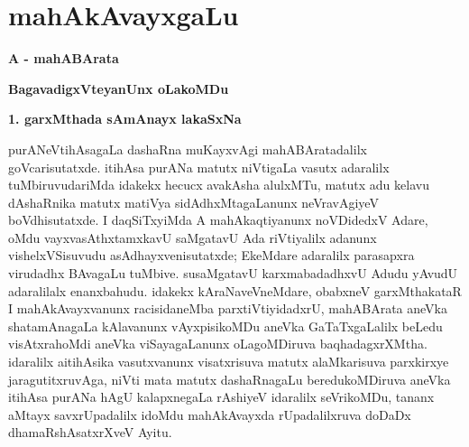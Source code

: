 \makeatletter
\def\@makechapterhead#1{%
  \vspace*{10\p@}%
{\fontsize{13pt}{13pt}\selectfont\raggedright{\bf  sushiVlf kumArf DeV}\par}
\vspace*{25\p@}%
  {\parindent \z@ \centering \normalfont
    \ifnum \c@secnumdepth >\m@ne
      \if@mainmatter
        {\huge\bfseries  #1}\par\nobreak
	\vskip 4pt
      \fi
    \fi
\smallskip 

 \vskip 10\p@  
{\fontsize{12pt}{12pt}\selectfont\raggedleft{anu: \bf pu.ti.na.}\par}
  }
\vskip 40\p@}
\makeatother

\chapter{mahAkAvayxgaLu}\label{chap004}

\begin{center}
{\LARGE\bf A - mahABArata}

\medskip
{\LARGE\bf BagavadigxVteyanUnx oLakoMDu}
\end{center}

\begin{center}
{\Large\bf 1. garxMthada sAmAnayx lakaSxNa}
\end{center}

purANeVtihAsagaLa dashaRna  muKayxvAgi mahABAratadalilx goVcarisutatxde. itihAsa purANa matutx niVtigaLa vasutx adaralilx tuMbiruvudariMda idakekx hecucx avakAsha alulxMTu, matutx adu kelavu dAshaRnika matutx matiVya sidAdhxMtagaLanunx  neVravAgiyeV boVdhisutatxde. I daqSiTxyiMda A mahAkaqtiyanunx noVDidedxV Adare, oMdu vayxvasAthxtamxkavU saMgatavU Ada riVtiyalilx adanunx vishelxVSisuvudu asAdhayxvenisutatxde; EkeMdare adaralilx parasapxra virudadhx BAvagaLu tuMbive. susaMgatavU karxmabadadhxvU Adudu yAvudU adaralilalx enanxbahudu. idakekx kAraNaveVneMdare, obabxneV garxMthakataR I mahAkAvayxvanunx racisidaneMba parxtiVtiyidadxrU, mahABArata aneVka shatamAnagaLa kAlavanunx vAyxpisikoMDu aneVka GaTaTxgaLalilx beLedu visAtxrahoMdi aneVka viSayagaLanunx oLagoMDiruva baqhadagxrXMtha. idaralilx aitihAsika vasutxvanunx visatxrisuva matutx alaMkarisuva parxkirxye jaragutitxruvAga, niVti mata matutx dashaRnagaLu beredukoMDiruva aneVka itihAsa purANa hAgU kalapxnegaLa rAshiyeV idaralilx seVrikoMDu, tananx aMtayx savxrUpadalilx idoMdu mahAkAvayxda rUpadalilxruva doDaDx dhamaRshAsatxrXveV Ayitu.

